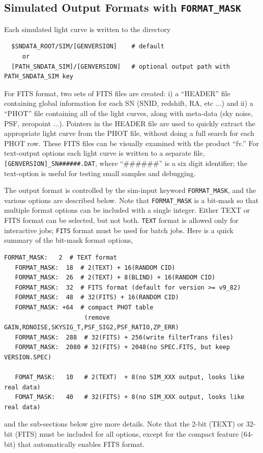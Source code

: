 \documentclass[12pt]{article}
\begin{document}
  \clearpage
   \subsection{Simulated Output Formats with {\tt FORMAT\_MASK} }
   \label{subsec:sim_formats}

Each simulated light curve is written 
to the directory
\begin{verbatim}
  $SNDATA_ROOT/SIM/[GENVERSION]    # default
     or
  [PATH_SNDATA_SIM]/[GENVERSION]   # optional output path with PATH_SNDATA_SIM key
\end{verbatim}
For FITS format, two sets of FITS files are created: 
i) a ``HEADER'' file containing global information 
for each SN (SNID, redshift, RA, etc ...) 
and ii) a ``PHOT'' file containing all of the light curves,
along with meta-data (sky noise, PSF, zeropoint ...).
Pointers in the HEADER file are used to quickly extract the
appropriate light curve from the PHOT file, without doing a full
search for each PHOT row.
These FITS files can be visually examined with the product ``fv.''
For text-output options each light curve is written to a
separate file, {\tt [GENVERSION]\_SN\#\#\#\#\#\#.DAT},
where ``\#\#\#\#\#\#'' is a six digit identifier;
the text-option is useful for testing small samples and
debugging. 


The output format is controlled by the sim-input keyword
{\tt FORMAT\_MASK}, and the various options are described
below. Note that {\tt FORMAT\_MASK} is a bit-mask so that
multiple format options can be included with a single integer.
Either TEXT or FITS format can be selected, but not both.
{\tt TEXT} format is allowed only for interactive jobs; 
{\tt FITS} format must be used for batch jobs.
Here is a quick summary of the bit-mask format options,
%

\begin{Verbatim}[frame=single]
   FORMAT_MASK:   2  # TEXT format
   FORMAT_MASK:  18  # 2(TEXT) + 16(RANDOM CID)
   FORMAT_MASK:  26  # 2(TEXT) + 8(BLIND) + 16(RANDOM CID)
   FORMAT_MASK:  32  # FITS format (default for version >= v9_82)
   FORMAT_MASK:  48  # 32(FITS) + 16(RANDOM CID)
   FORMAT_MASK: +64  # compact PHOT table 
                      (remove GAIN,RDNOISE,SKYSIG_T,PSF_SIG2,PSF_RATIO,ZP_ERR)
   FORMAT_MASK:  288  # 32(FITS) + 256(write filterTrans files)
   FORMAT_MASK:  2080 # 32(FITS) + 2048(no SPEC.FITS, but keep VERSION.SPEC)

   FOMAT_MASK:   10   # 2(TEXT)  + 8(no SIM_XXX output, looks like real data)
   FOMAT_MASK:   40   # 32(FITS) + 8(no SIM_XXX output, looks like real data)
\end{Verbatim}
%
and the sub-sections below give more details.
Note that the 2-bit (TEXT) or 32-bit (FITS) must be included for all options,
except for the compact feature (64-bit) that automatically enables FITS format.
\end{document}
